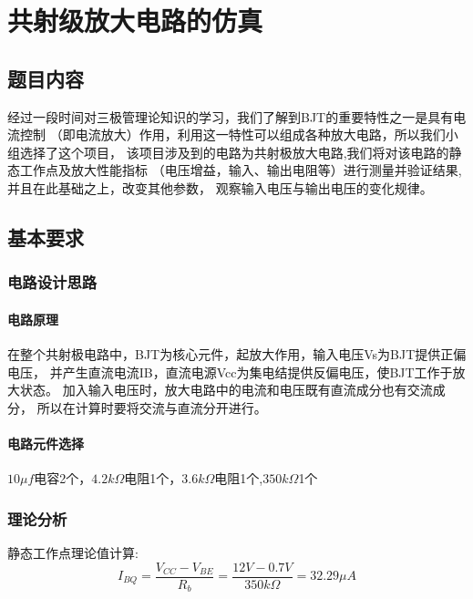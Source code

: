 \documentclass[10pt, conference, compsocconf, a4paper]{IEEEtran}
\begin{document}
\section{共射级放大电路的仿真}
\subsection{题目内容}
经过一段时间对三极管理论知识的学习，我们了解到BJT的重要特性之一是具有电流控制
（即电流放大）作用，利用这一特性可以组成各种放大电路，所以我们小组选择了这个项目，
该项目涉及到的电路为共射极放大电路,我们将对该电路的静态工作点及放大性能指标
（电压增益，输入、输出电阻等）进行测量并验证结果,并且在此基础之上，改变其他参数，
观察输入电压与输出电压的变化规律。

\subsection{基本要求}
\subsubsection{电路设计思路}
\paragraph{电路原理}\noindent

在整个共射极电路中，BJT为核心元件，起放大作用，输入电压Vs为BJT提供正偏电压，
并产生直流电流IB，直流电源Vcc为集电结提供反偏电压，使BJT工作于放大状态。
加入输入电压时，放大电路中的电流和电压既有直流成分也有交流成分，
所以在计算时要将交流与直流分开进行。
\paragraph{电路元件选择}\noindent

$10\mu f$电容2个，$4.2k\Omega$电阻1个，$3.6k\Omega$电阻1个,$350k\Omega$1个
\subsubsection{理论分析} %
静态工作点理论值计算:\cite{elecTextBook}
\begin{equation}
  I_{BQ}=\frac{V_{CC}-V_{BE}}{R_b}=\frac{12V-0.7V}{350k\Omega}=32.29\mu A
\end{equation}
\end{document}
